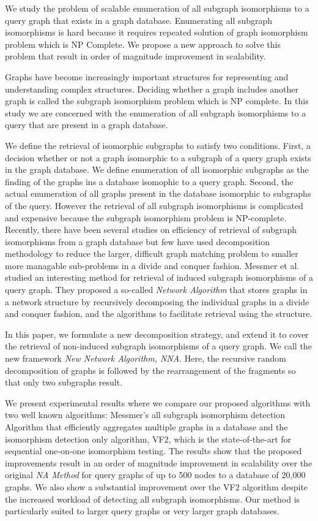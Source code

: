 We study the problem of scalable enumeration of all subgraph isomorphisms to a query graph that exists in a graph database. Enumerating all subgraph isomorphisms is hard because it requires repeated solution of graph isomorphism problem which is NP Complete. We  propose a new  approach to solve this problem that result in order of magnitude improvement in scalability. 

Graphs have become increasingly important structures for representing and understanding complex structures. Deciding whether a graph includes another graph is called the subgraph isomorphism problem which is NP complete. In this study we are concerned with the enumeration of all subgraph isomorphisms to a query that are present in a graph database.

We define the retrieval of isomorphic subgraphs to satisfy two conditions.  
First, a decision whether or not a graph isomorphic to a subgraph of a query graph exists in the graph database.
We define enumeration of all isomorphic subgraphs as the finding of the graphs ins a database isomophic to a query graph.
 Second, the actual enumeration of all graphs present in the database isomorphic to subgraphs of the query. However the retrieval of all subgraph isomorphisms is complicated and expensive because the subgraph isomorphism problem is NP-complete.
Recently, there have been several studies on efficiency of retrieval of subgraph isomorphisms from a graph database but few have used decomposition methodology to reduce the larger, difficult graph matching problem to smaller more managable sub-problems in a divide and conquer fashion. Messmer et al. studied an interesting method for retrieval of induced subgraph isomorphisms of a query graph. They proposed a so-called \textit{Network Algorithm} that stores graphs  in a network structure  by recursively decomposing the individual graphs in a divide and conquer fashion, and the algorithms to facilitate retrieval using the structure.

In this paper, we formulate a new decomposition strategy, and extend it to cover the retrieval of non-induced subgraph isomorphisms of a query graph. We call the new framework  \textit{New  Network Algorithm, NNA}. Here, the recursive random decomposition of graphs is followed by the rearrangement of the fragments so that only two subgraphs result.

We present experimental results where we compare our proposed algorithms with two well known algorithms: Messmer's all subgraph isomorphism detection Algorithm that efficiently aggregates multiple graphs in a database and the isomorphism detection only algorithm, VF2, which is the state-of-the-art for sequential one-on-one isomorphism testing. The results show that the proposed improvements result in an order of magnitude improvement in scalability over the original \textit{NA Method}  for query graphs of up to 500 nodes to a database of 20,000 graphs. We also show a substantial improvement over the VF2 algorithm despite the increased workload of detecting all subgraph isomorphisms. Our method is particularly suited to larger query graphs or very larger graph databases.

